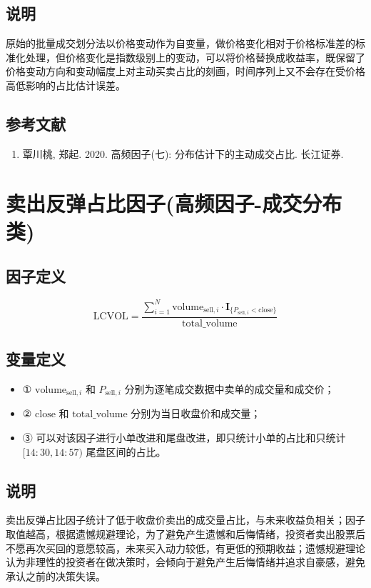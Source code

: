 \documentclass{article}
\begin{document}
\subsection{说明}
原始的批量成交划分法以价格变动作为自变量，做价格变化相对于价格标准差的标准化处理，但价格变化是指数级别上的变动，可以将价格替换成收益率，既保留了价格变动方向和变动幅度上对主动买卖占比的刻画，时间序列上又不会存在受价格高低影响的占比估计误差。

\subsection{参考文献}
\begin{enumerate}
    \item 覃川桃, 郑起. 2020. 高频因子(七): 分布估计下的主动成交占比. 长江证券.
\end{enumerate}

\section{卖出反弹占比因子(高频因子-成交分布类)}

\subsection{因子定义}
\begin{equation}
    \mathrm{LCVOL} = \frac{\sum_{i=1}^{N} \mathrm{volume}_{\mathrm{sell},i} \cdot \mathbf{I}_{\{P_{\mathrm{sell},i} < \mathrm{close}\}}}{\mathrm{total\_volume}}
\end{equation}

\subsection{变量定义}
\begin{itemize}
    \item ① \( \mathrm{volume}_{\mathrm{sell},i} \) 和 \( P_{\mathrm{sell},i} \) 分别为逐笔成交数据中卖单的成交量和成交价；
    \item ② \( \mathrm{close} \) 和 \( \mathrm{total\_volume} \) 分别为当日收盘价和成交量；
    \item ③ 可以对该因子进行小单改进和尾盘改进，即只统计小单的占比和只统计 \([14:30,14:57)\) 尾盘区间的占比。
\end{itemize}

\subsection{说明}
卖出反弹占比因子统计了低于收盘价卖出的成交量占比，与未来收益负相关；因子取值越高，根据遗憾规避理论，为了避免产生遗憾和后悔情绪，投资者卖出股票后不愿再次买回的意愿较高，未来买入动力较低，有更低的预期收益；遗憾规避理论认为非理性的投资者在做决策时，会倾向于避免产生后悔情绪并追求自豪感，避免承认之前的决策失误。
\end{document}
